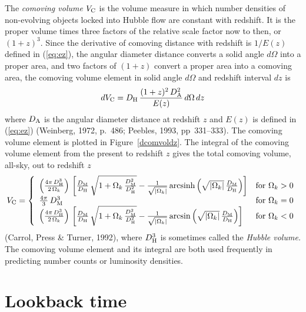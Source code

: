 The {\em comoving volume\/} $V_{\rm C}$ is the volume measure in which
number densities of non-evolving objects locked into Hubble flow are
constant with redshift.  It is the proper volume times three factors
of the relative scale factor now to then, or $(1+z)^3$.  Since the
derivative of comoving distance with redshift is $1/E(z)$ defined in
(\ref{eq:ez}), the angular diameter distance converts a solid angle
$d\Omega$ into a proper area, and two factors of $(1+z)$ convert a
proper area into a comoving area, the comoving volume element in solid
angle $d\Omega$ and redshift interval $dz$ is
\begin{equation}
dV_{\rm C}= D_{\rm H}\,\frac{(1+z)^2\,D_{\rm A}^2}{E(z)}\,d\Omega\,dz
\end{equation}
where $D_{\rm A}$ is the angular diameter distance at redshift $z$ and
$E(z)$ is defined in (\ref{eq:ez}) (Weinberg, 1972, p.~486; Peebles,
1993, pp~331--333).  The comoving volume element is plotted in
Figure~\ref{dcomvoldz}.  The integral of the comoving volume element
from the present to redshift $z$ gives the total comoving volume,
all-sky, out to redshift $z$
\begin{equation}
V_{\rm C} = \left\{
\begin{array}{ll}
  \left(\frac{4\pi\,D_{\rm H}^3}{2\,\Omega_k}\right)\,
  \left[\frac{D_{\rm M}}{D_{\rm H}}\,
  \sqrt{1+\Omega_k\,\frac{D_{\rm M}^2}{D_{\rm H}^2}}
  -\frac{1}{\sqrt{|\Omega_k|}}\,
  {\rm arcsinh}\left(\sqrt{|\Omega_k|}\,\frac{D_{\rm M}}{D_{\rm H}}\right)\right]
  & {\rm for}~\Omega_k>0 \\
  \frac{4\pi}{3}\,D_{\rm M}^3
  & {\rm for}~\Omega_k=0 \\
  \left(\frac{4\pi\,D_{\rm H}^3}{2\,\Omega_k}\right)\,
  \left[\frac{D_{\rm M}}{D_{\rm H}}\,
  \sqrt{1+\Omega_k\,\frac{D_{\rm M}^2}{D_{\rm H}^2}}
  -\frac{1}{\sqrt{|\Omega_k|}}\,
  {\rm arcsin}\left(\sqrt{|\Omega_k|}\,\frac{D_{\rm M}}{D_{\rm H}}\right)\right]
  & {\rm for}~\Omega_k<0
\end{array}
\right.
\end{equation}
(Carrol, Press \& Turner, 1992), where $D_{\rm H}^3$ is sometimes
called the {\em Hubble volume.\/} The comoving volume element and its
integral are both used frequently in predicting number counts or
luminosity densities.


\section{Lookback time}

